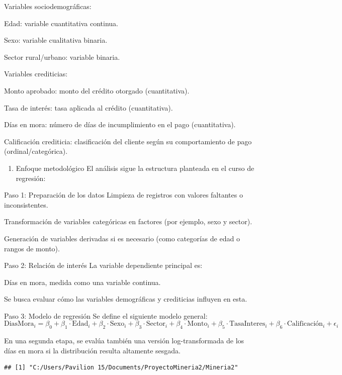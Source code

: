 \documentclass[Royal,times,sageh]{sagej}
\providecommand{\tightlist}{%
  \setlength{\itemsep}{0pt}\setlength{\parskip}{0pt}}
\begin{document}
Variables sociodemográficas:

Edad: variable cuantitativa continua.

Sexo: variable cualitativa binaria.

Sector rural/urbano: variable binaria.

Variables crediticias:

Monto aprobado: monto del crédito otorgado (cuantitativa).

Tasa de interés: tasa aplicada al crédito (cuantitativa).

Días en mora: número de días de incumplimiento en el pago
(cuantitativa).

Calificación crediticia: clasificación del cliente según su
comportamiento de pago (ordinal/categórica).

\begin{enumerate}
\def\labelenumi{\arabic{enumi}.}
\setcounter{enumi}{1}
\tightlist
\item
  Enfoque metodológico El análisis sigue la estructura planteada en el
  curso de regresión:
\end{enumerate}

Paso 1: Preparación de los datos Limpieza de registros con valores
faltantes o inconsistentes.

Transformación de variables categóricas en factores (por ejemplo, sexo y
sector).

Generación de variables derivadas si es necesario (como categorías de
edad o rangos de monto).

Paso 2: Relación de interés La variable dependiente principal es:

Días en mora, medida como una variable continua.

Se busca evaluar cómo las variables demográficas y crediticias influyen
en esta.

Paso 3: Modelo de regresión Se define el siguiente modelo general: \[
\text{DiasMora}_i = \beta_0 + \beta_1 \cdot \text{Edad}_i + \beta_2 \cdot \text{Sexo}_i + \beta_3 \cdot \text{Sector}_i + \beta_4 \cdot \text{Monto}_i + \beta_5 \cdot \text{TasaInteres}_i + \beta_6 \cdot \text{Calificación}_i + \epsilon_i
\]

En una segunda etapa, se evalúa también una versión log-transformada de
los días en mora si la distribución resulta altamente sesgada.

\begin{verbatim}
## [1] "C:/Users/Pavilion 15/Documents/ProyectoMineria2/Mineria2"
\end{verbatim}
\end{document}
